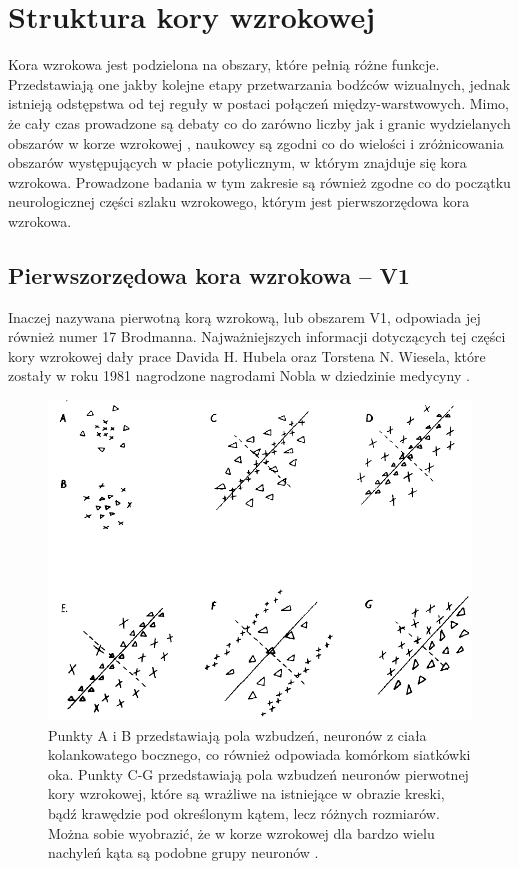 \section{Struktura kory wzrokowej}
\label{strukturaKoryWzrokowej}
%
%
Kora wzrokowa jest podzielona na obszary, które pełnią różne funkcje. Przedstawiają one jakby kolejne etapy przetwarzania bodźców wizualnych, jednak istnieją odstępstwa od tej reguły w postaci połączeń między-warstwowych. Mimo, że cały czas prowadzone są debaty co do zarówno liczby jak i granic wydzielanych obszarów w korze wzrokowej \cite{Kaas1995}, naukowcy są zgodni co do wielości i zróżnicowania obszarów występujących w płacie potylicznym, w którym znajduje się kora wzrokowa. Prowadzone badania w tym zakresie są również zgodne co do początku neurologicznej części szlaku wzrokowego, którym jest pierwszorzędowa kora wzrokowa.

\label{v1}
\subsection{Pierwszorzędowa kora wzrokowa -- V1}
Inaczej nazywana pierwotną korą wzrokową, lub obszarem V1, odpowiada jej również numer 17 Brodmanna. Najważniejszych informacji dotyczących tej części kory wzrokowej dały prace Davida H. Hubela oraz Torstena N. Wiesela, które zostały w roku 1981 nagrodzone nagrodami Nobla w dziedzinie medycyny \cite{hubelnobel,wieselnobel}.\\

\begin{figure}[ht]
	\centering
	\includegraphics[width=1.00\textwidth]{images/HandW.png}
	\caption{Punkty A i B przedstawiają pola wzbudzeń, neuronów z ciała kolankowatego bocznego, co również odpowiada komórkom siatkówki oka. Punkty C-G przedstawiają pola wzbudzeń neuronów pierwotnej kory wzrokowej, które są wrażliwe na istniejące w obrazie kreski, bądź krawędzie pod określonym kątem, lecz różnych rozmiarów. Można sobie wyobrazić, że w korze wzrokowej dla bardzo wielu nachyleń kąta są podobne grupy neuronów \cite{hubelnobel}.}
	\label{fig:handw}
\end{figure}

